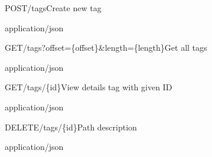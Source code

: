 
\begin{apiRoute}{POST}{/tags}{Create new tag}
{
}
{ }

\begin{routeResponse}{application/json}
\end{routeResponse}
\end{apiRoute}




\begin{apiRoute}{GET}{/tags?offset=\{offset\}\&length=\{length\}}{Get all tags}
{
}
{ }
\begin{queryParameter} 
\end{queryParameter}

\begin{routeResponse}{application/json}
\end{routeResponse}
\end{apiRoute}




\begin{apiRoute}{GET}{/tags/\{id\}}{View details tag with given ID}
{
}
{ }

\begin{routeParameter} 
\end{routeParameter}
\begin{routeResponse}{application/json}
\end{routeResponse}
\end{apiRoute}



\begin{apiRoute}{DELETE}{/tags/\{id\}}{Path description}
{
}
{ }

\begin{routeParameter} 
\end{routeParameter}
\begin{routeResponse}{application/json}
\end{routeResponse}
\end{apiRoute}

